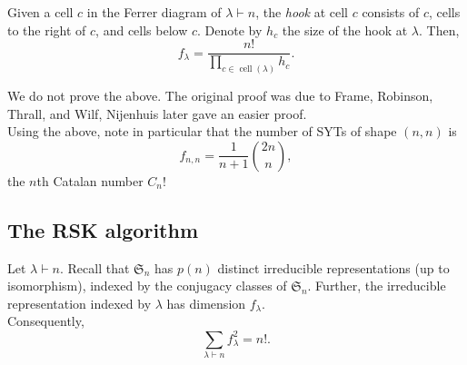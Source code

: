 	\begin{ftheo}
		Given a cell $c$ in the Ferrer diagram of $\lambda \vdash n$, the \emph{hook} at cell $c$ consists of $c$, cells to the right of $c$, and cells below $c$. Denote by $h_c$ the size of the hook at $\lambda$. Then,
		\[ f_\lambda = \frac{n!}{\prod_{c \in \operatorname{cell}(\lambda)} h_c}. \]
	\end{ftheo}
	We do not prove the above. The original proof was due to Frame, Robinson, Thrall, and Wilf, Nijenhuis later gave an easier proof.\\
	Using the above, note in particular that the number of SYTs of shape $(n,n)$ is
	\[ f_{n,n} = \frac{1}{n+1} \binom{2n}{n}, \]
	the $n$th Catalan number $C_n$!

\subsection{The RSK algorithm}

	\begin{ftheo}
		Let $\lambda \vdash n$. Recall that $\mathfrak{S}_n$ has $p(n)$ distinct irreducible representations (up to isomorphism), indexed by the conjugacy classes of $\mathfrak{S}_n$. Further, the irreducible representation indexed by $\lambda$ has dimension $f_\lambda$.\\
		Consequently,
		\[ \sum_{\lambda \vdash n} f_\lambda^2 = n!. \]
	\end{ftheo}


